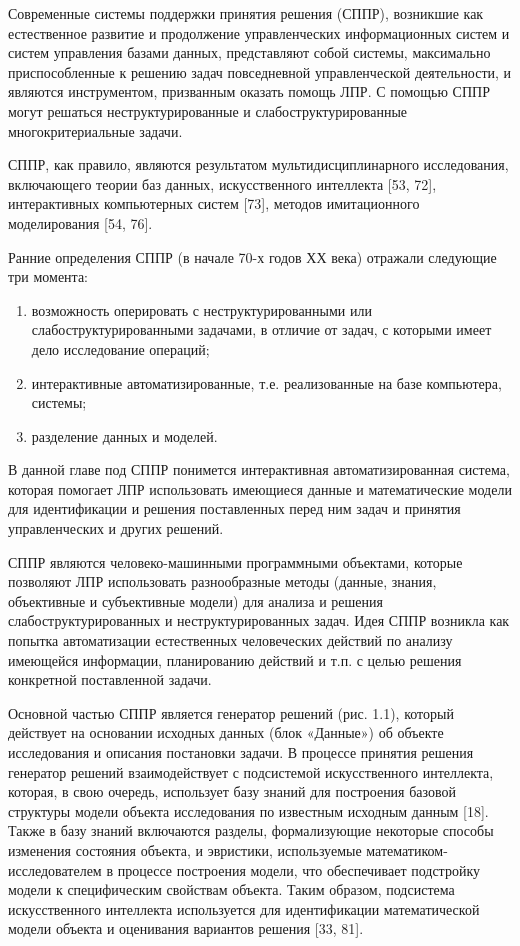 Современные системы поддержки принятия решения (СППР), возникшие как естественное развитие и продолжение управленческих информационных систем и систем управления базами данных, представляют собой системы, максимально приспособленные к решению задач повседневной управленческой деятельности, и являются инструментом, призванным оказать помощь ЛПР. С помощью СППР могут решаться неструктурированные и слабоструктурированные многокритериальные задачи.

СППР, как правило, являются результатом мультидисциплинарного исследования, включающего теории баз данных, искусственного интеллекта [53, 72], интерактивных компьютерных систем [73], методов имитационного моделирования [54, 76].

Ранние определения СППР (в начале 70-х годов ХХ века) отражали следующие три момента:
\begin{enumerate}
\item возможность оперировать с неструктурированными или слабоструктурированными задачами, в отличие от задач, с которыми имеет дело исследование операций;
\item интерактивные автоматизированные, т.е. реализованные на базе компьютера, системы;
\item разделение данных и моделей.
\end{enumerate}

В данной главе под СППР понимется интерактивная автоматизированная система, которая помогает ЛПР использовать имеющиеся данные и математические модели для идентификации и решения поставленных перед ним задач и принятия управленческих и других решений.

СППР являются человеко-машинными программными объектами, которые позволяют ЛПР использовать разнообразные методы (данные, знания, объективные и субъективные модели) для анализа и решения слабоструктурированных и неструктурированных задач. Идея СППР возникла как попытка автоматизации естественных человеческих действий по анализу имеющейся информации, планированию действий и т.п. с целью решения конкретной поставленной задачи.

Основной частью СППР является генератор решений (рис. 1.1), который действует на основании исходных данных (блок «Данные») об объекте исследования и описания постановки задачи. В процессе принятия решения генератор решений взаимодействует с подсистемой искусственного интеллекта, которая, в свою очередь, использует базу знаний для построения базовой структуры модели объекта исследования по известным исходным данным [18]. Также в базу знаний включаются разделы, формализующие некоторые способы изменения состояния объекта, и эвристики, используемые математиком-исследователем в процессе построения модели, что обеспечивает подстройку модели к специфическим свойствам объекта. Таким образом, подсистема искусственного интеллекта используется для идентификации математической модели объекта и оценивания вариантов решения [33, 81].

